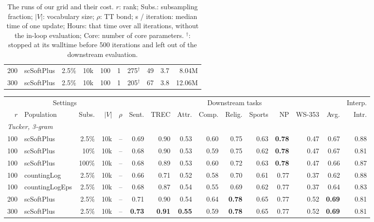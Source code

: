 \begin{table}[t]
\begin{tabular}{rlrrrrrrrr}
    200 & scSoftPlus & 2.5\% & 10k & 100 & 1 & 275$^\dagger$ & 49 & 3.7 & 8.04M \\
    300 & scSoftPlus & 2.5\% & 10k & 100 & 1 & 205$^\dagger$ & 67 & 3.8 & 12.06M \\
    \bottomrule
  \end{tabular}
  \caption{The runs of our grid and their cost. $r$: rank; Subs.: subsampling fraction; $|V|$: vocabulary size; $\rho$: TT bond; s / iteration: median time of one update; Hours: that time over all iterations, without the in-loop evaluation; Core: number of core parameters. $^\dagger$: stopped at its walltime before 500 iterations and left out of the downstream evaluation.}
  \label{tab:grid}
\end{table}

\begin{table}[t]
  \centering
  \footnotesize
  \setlength{\tabcolsep}{4pt}
  \begin{tabular}{rlrrrrrrrrrrrrr}
    \toprule
    \multicolumn{5}{c}{Settings} & \multicolumn{9}{c}{Downstream tasks} & \multicolumn{1}{c}{Interp.} \\
    \cmidrule(lr){1-5} \cmidrule(lr){6-14} \cmidrule(lr){15-15}
    $r$ & Population & Subs. & $|V|$ & $\rho$ & Sent. & TREC & Attr. & Comp. & Relig. & Sports & NP & WS-353 & Avg. & Intr. \\
    \midrule
    \multicolumn{15}{l}{\textit{Tucker, 3-gram}} \\
    100 & scSoftPlus & 2.5\% & 10k & -- & 0.69 & 0.90 & 0.53 & 0.60 & 0.75 & 0.63 & \textbf{0.78} & 0.47 & 0.67 & 0.88 \\
    100 & scSoftPlus & 10\% & 10k & -- & 0.68 & 0.90 & 0.53 & 0.59 & 0.75 & 0.62 & \textbf{0.78} & 0.47 & 0.67 & 0.81 \\
    100 & scSoftPlus & 100\% & 10k & -- & 0.68 & 0.89 & 0.53 & 0.60 & 0.72 & 0.63 & \textbf{0.78} & 0.47 & 0.66 & 0.87 \\
    100 & countingLog & 2.5\% & 10k & -- & 0.66 & 0.71 & 0.52 & 0.58 & 0.70 & 0.61 & 0.77 & 0.37 & 0.62 & 0.88 \\
    100 & countingLogEps & 2.5\% & 10k & -- & 0.68 & 0.87 & 0.54 & 0.55 & 0.69 & 0.62 & 0.77 & 0.37 & 0.64 & 0.83 \\
    200 & scSoftPlus & 2.5\% & 10k & -- & 0.71 & 0.90 & 0.54 & 0.64 & \textbf{0.78} & 0.65 & 0.77 & 0.52 & \textbf{0.69} & 0.81 \\
    300 & scSoftPlus & 2.5\% & 10k & -- & \textbf{0.73} & \textbf{0.91} & \textbf{0.55} & 0.59 & \textbf{0.78} & 0.65 & 0.77 & 0.52 & \textbf{0.69} & 0.81 \\

\end{tabular}
\end{table}
